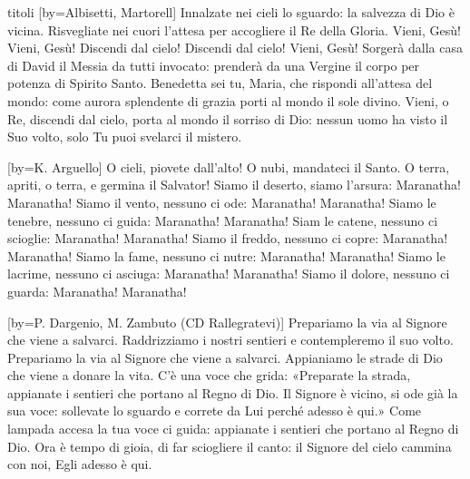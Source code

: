 \begin{songs}{titoli}
[by={Albisetti, Martorell}]
\beginverse
Innalzate nei cieli lo sguardo: la salvezza di Dio è vicina.
Risvegliate nei cuori l'attesa per accogliere il Re della Gloria.
\endverse
\beginchorus
Vieni, Gesù! Vieni, Gesù! Discendi dal cielo! Discendi dal cielo!
Vieni, Gesù!
\endchorus
\beginverse
Sorgerà dalla casa di David il Messia da tutti invocato:
prenderà da una Vergine il corpo per potenza di Spirito Santo.
\endverse
\beginverse
Benedetta sei tu, Maria, che rispondi all'attesa del mondo:
come aurora splendente di grazia porti al mondo il sole divino.
\endverse
\beginverse
Vieni, o Re, discendi dal cielo, porta al mondo il sorriso di Dio:
nessun uomo ha visto il Suo volto, solo Tu puoi svelarci il mistero.
\endverse
\endsong

[by={K. Arguello}]
\beginchorus
O cieli, piovete dall'alto! O nubi, mandateci il Santo.
O terra, apriti, o terra, e germina il Salvator!
\endchorus
\beginverse
Siamo il deserto, siamo l'arsura: Maranatha! Maranatha!
Siamo il vento, nessuno ci ode: Maranatha! Maranatha!
\endverse
\beginverse
Siamo le tenebre, nessuno ci guida: Maranatha! Maranatha!
Siam le catene, nessuno ci scioglie: Maranatha! Maranatha!
\endverse
\beginverse
Siamo il freddo, nessuno ci copre: Maranatha! Maranatha!
Siamo la fame, nessuno ci nutre: Maranatha! Maranatha!
\endverse
\beginverse
Siamo le lacrime, nessuno ci asciuga: Maranatha! Maranatha!
Siamo il dolore, nessuno ci guarda: Maranatha! Maranatha!
\endverse
\endsong

[by={P. Dargenio, M. Zambuto (CD Rallegratevi)}]
\beginchorus
Prepariamo la via
al Signore che viene a salvarci.
Raddrizziamo i nostri sentieri
e contempleremo il suo volto.
Prepariamo la via
al Signore che viene a salvarci.
Appianiamo le strade di Dio
che viene a donare la vita.
\endchorus
\beginverse
C'è una voce che grida:
«Preparate la strada,
appianate i sentieri
che portano al Regno di Dio.
Il Signore è vicino,
si ode già la sua voce:
sollevate lo sguardo e correte da Lui perché adesso è qui.»
\endverse
\beginverse
Come lampada accesa
la tua voce ci guida:
appianate i sentieri
che portano al Regno di Dio.
Ora è tempo di gioia,
di far sciogliere il canto:
il Signore del cielo cammina con noi, Egli adesso è qui.
\endverse
\endsong


\end{songs}
